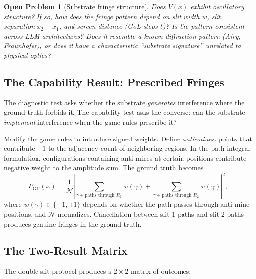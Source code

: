 \documentclass[12pt,a4paper]{article}
\newtheorem{openproblem}[theorem]{Open Problem}
\theoremstyle{definition}
\theoremstyle{remark}
\begin{document}
\begin{openproblem}[Substrate fringe structure]
\label{op:fringes}
Does $V(x)$ exhibit oscillatory structure?  If so, how does the fringe pattern depend on slit width $w$, slit separation $x_2 - x_1$, and screen distance (GoL steps $t$)?  Is the pattern consistent across LLM architectures?  Does it resemble a known diffraction pattern (Airy, Fraunhofer), or does it have a characteristic ``substrate signature'' unrelated to physical optics?
\end{openproblem}

\subsection{The Capability Result: Prescribed Fringes}
\label{sec:prescribed-fringes}

The diagnostic test asks whether the substrate \emph{generates} interference where the ground truth forbids it.  The capability test asks the converse: can the substrate \emph{implement} interference when the game rules prescribe it?

Modify the game rules to introduce signed weights.  Define \emph{anti-mines}: points that contribute $-1$ to the adjacency count of neighboring regions.  In the path-integral formulation, configurations containing anti-mines at certain positions contribute negative weight to the amplitude sum.  The ground truth becomes
\begin{equation}\label{eq:signed-path-sum}
  P_{\text{GT}}(x) = \frac{1}{\mathcal{N}} \left| \sum_{\gamma \in \text{paths through } R_1} w(\gamma) + \sum_{\gamma \in \text{paths through } R_2} w(\gamma) \right|^2,
\end{equation}
where $w(\gamma) \in \{-1, +1\}$ depends on whether the path passes through anti-mine positions, and $\mathcal{N}$ normalizes.  Cancellation between slit-1 paths and slit-2 paths produces genuine fringes in the ground truth.

\subsection{The Two-Result Matrix}

The double-slit protocol produces a $2 \times 2$ matrix of outcomes:
\end{document}
